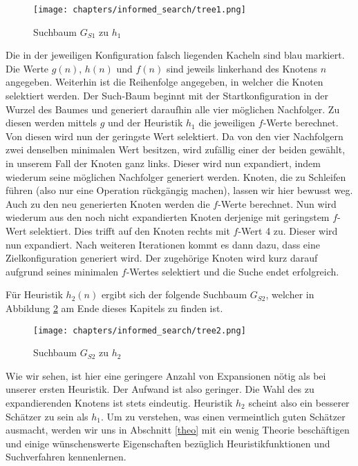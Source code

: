 \begin{figure}[p]
	\texttt{[image: chapters/informed\_search/tree1.png]}
	\caption{Suchbaum $G_{S1}$ zu $h_{1}$}
	\label{fig:figure1}
\end{figure}

Die in der jeweiligen Konfiguration falsch liegenden Kacheln sind blau markiert. Die Werte $g(n)$, $h(n)$ und $f(n)$ sind jeweils linkerhand des Knotens $n$ angegeben. Weiterhin ist die Reihenfolge angegeben, in welcher die Knoten selektiert werden.
Der Such-Baum beginnt mit der Startkonfiguration in der Wurzel des Baumes und generiert daraufhin alle vier möglichen Nachfolger. Zu diesen werden mittels $g$ und der Heuristik $h_{1}$ die jeweiligen $f$-Werte berechnet. Von diesen wird nun der geringste Wert selektiert. Da von den vier Nachfolgern zwei denselben minimalen Wert besitzen, wird zufällig einer der beiden gewählt, in unserem Fall der Knoten ganz links. Dieser wird nun expandiert, indem wiederum seine möglichen Nachfolger generiert werden. Knoten, die zu Schleifen führen (also nur eine Operation rückgängig machen), lassen wir hier bewusst weg. Auch zu den neu generierten Knoten werden die $f$-Werte berechnet. Nun wird wiederum aus den noch nicht expandierten Knoten derjenige mit geringstem $f$-Wert selektiert. Dies trifft auf den Knoten rechts mit $f$-Wert 4 zu. Dieser wird nun expandiert. Nach weiteren Iterationen kommt es dann dazu, dass eine Zielkonfiguration generiert wird. Der zugehörige Knoten wird kurz darauf aufgrund seines minimalen $f$-Wertes selektiert und die Suche endet erfolgreich.

Für Heuristik $h_{2}(n)$ ergibt sich der folgende Suchbaum $G_{S2}$, welcher in Abbildung \ref{fig:figure2} am Ende dieses Kapitels zu finden ist.

\begin{figure}[p]
	\texttt{[image: chapters/informed\_search/tree2.png]}
	\caption{Suchbaum $G_{S2}$ zu $h_{2}$}
	\label{fig:figure2}
\end{figure}

Wie wir sehen, ist hier eine geringere Anzahl von Expansionen nötig als bei unserer ersten Heuristik. Der Aufwand ist also geringer. Die Wahl des zu expandierenden Knotens ist stets eindeutig. Heuristik $h_{2}$ scheint also ein besserer Schätzer zu sein als $h_{1}$. Um zu verstehen, was einen vermeintlich guten Schätzer ausmacht, werden wir uns in Abschnitt \ref{theo} mit ein wenig Theorie beschäftigen und einige wünschenswerte Eigenschaften bezüglich Heuristikfunktionen und Suchverfahren kennenlernen.


